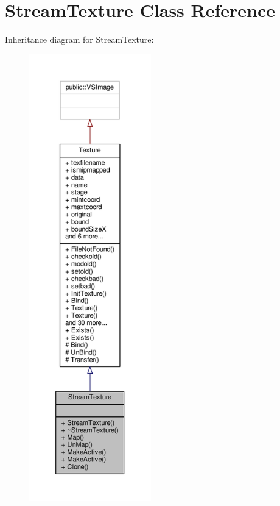 \hypertarget{classStreamTexture}{}\section{Stream\+Texture Class Reference}
\label{classStreamTexture}


Inheritance diagram for Stream\+Texture\+:
\nopagebreak
\begin{figure}[H]
\begin{center}
\leavevmode
\includegraphics[height=550pt]{d0/db2/classStreamTexture__inherit__graph}
\end{center}
\end{figure}


